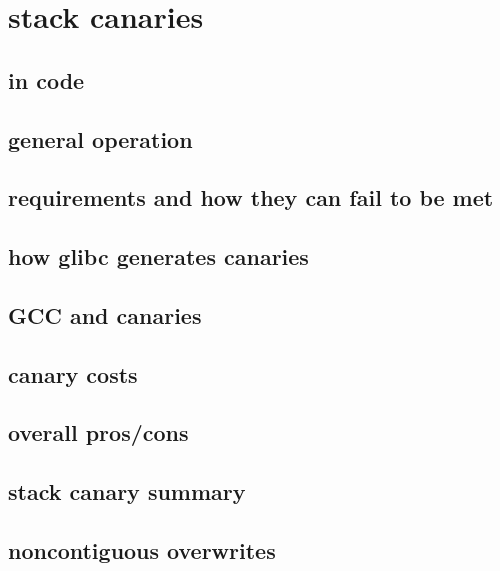 
\section{stack canaries}
\subsection{in code}


\subsection{general operation}


\subsection{requirements and how they can fail to be met}

\subsection{how glibc generates canaries}


\subsection{GCC and canaries}


\subsection{canary costs}


\subsection{overall pros/cons}


\subsection{stack canary summary}


\subsection{noncontiguous overwrites}


